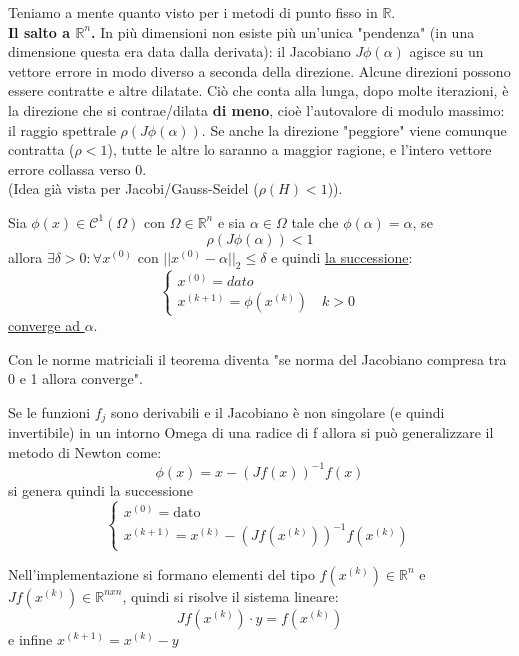 \documentclass[12pt,a4paper,]{report}
\begin{document}
\begin{nota}
    Teniamo a mente quanto visto per i metodi di punto fisso in $\mathbb{R}$.\\
    \textbf{Il salto a $\mathbb{R}^n$.} In più dimensioni non esiste più un'unica "pendenza" (in una dimensione questa era data dalla derivata): il Jacobiano $J\phi(\alpha)$ agisce su un vettore errore in modo diverso a seconda della direzione. Alcune direzioni possono essere contratte e altre dilatate. Ciò che conta alla lunga, dopo molte iterazioni, è la direzione che si contrae/dilata \textbf{di meno}, cioè l'autovalore di modulo massimo: il raggio spettrale $\rho(J\phi(\alpha))$. Se anche la direzione "peggiore" viene comunque contratta ($\rho<1$), tutte le altre lo saranno a maggior ragione, e l'intero vettore errore collassa verso $0$.\\
    (Idea già vista per Jacobi/Gauss-Seidel ($\rho(H)<1$)).
\end{nota}
\begin{teorema}
    Sia $\phi(x) \in \mathcal{C}^1(\Omega)$ con $\Omega \in \mathbb{R}^n$ e sia $\alpha \in \Omega$ tale che $\phi(\alpha) = \alpha $, se 
    $$\boxed{\rho\left(J\phi(\alpha)\right)<1 }$$
    allora $\exists \delta > 0 : \forall x^{(0)}$ con $||x^{(0)} - \alpha||_2 \leq \delta$ e quindi \uline{la successione}:
    \[
    \begin{cases}
        x^{(0)} = dato\\
        x^{(k+1)} = \phi(x^{(k)}) \quad k>0
    \end{cases}
    \]
    \uline{converge ad $\alpha$}.
\end{teorema}
\begin{nota}
    Con le norme matriciali il teorema diventa "se norma del Jacobiano compresa tra 0 e 1 allora converge".
\end{nota}
\begin{metodo}
    Se le funzioni $f_j$ sono derivabili e il Jacobiano è non singolare (e quindi invertibile) in un intorno Omega di una radice di f allora si può generalizzare il metodo di Newton come:
    \[
    \phi(x) = x - (Jf(x))^{-1}f(x)
    \]
    si genera quindi la successione
    \[
    \begin{cases}
        x^{(0)} = \text{dato}\\
        x^{(k+1)} = x^{(k)} - (Jf(x^{(k)}))^{-1}f(x^{(k)})
    \end{cases}
    \]
    \begin{nota}
        Nell'implementazione si formano elementi del tipo $f(x^{(k)})\in\mathbb{R}^n$ e $Jf(x^{(k)})\in\mathbb{R}^{nxn}$, quindi si risolve il sistema lineare:
        \[
        Jf(x^{(k)})\cdot y= f(x^{(k)})
        \]
        e infine $x^{(k+1)}=x^{(k)}-y$
    \end{nota}
\end{metodo}
\end{document}
